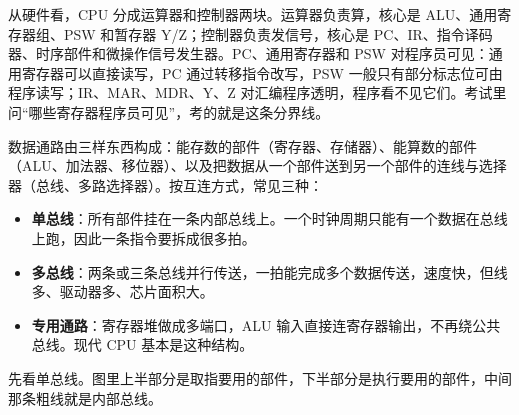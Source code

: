 从硬件看，CPU 分成运算器和控制器两块。运算器负责算，核心是 ALU、通用寄存器组、PSW 和暂存器 Y/Z；控制器负责发信号，核心是 PC、IR、指令译码器、时序部件和微操作信号发生器。PC、通用寄存器和 PSW 对程序员可见：通用寄存器可以直接读写，PC 通过转移指令改写，PSW 一般只有部分标志位可由程序读写；IR、MAR、MDR、Y、Z 对汇编程序透明，程序看不见它们。考试里问“哪些寄存器程序员可见”，考的就是这条分界线。

数据通路由三样东西构成：能存数的部件（寄存器、存储器）、能算数的部件（ALU、加法器、移位器）、以及把数据从一个部件送到另一个部件的连线与选择器（总线、多路选择器）。按互连方式，常见三种：

\begin{itemize}
  \item \textbf{单总线}：所有部件挂在一条内部总线上。一个时钟周期只能有一个数据在总线上跑，因此一条指令要拆成很多拍。
  \item \textbf{多总线}：两条或三条总线并行传送，一拍能完成多个数据传送，速度快，但线多、驱动器多、芯片面积大。
  \item \textbf{专用通路}：寄存器堆做成多端口，ALU 输入直接连寄存器输出，不再绕公共总线。现代 CPU 基本是这种结构。
\end{itemize}

先看单总线。图里上半部分是取指要用的部件，下半部分是执行要用的部件，中间那条粗线就是内部总线。

